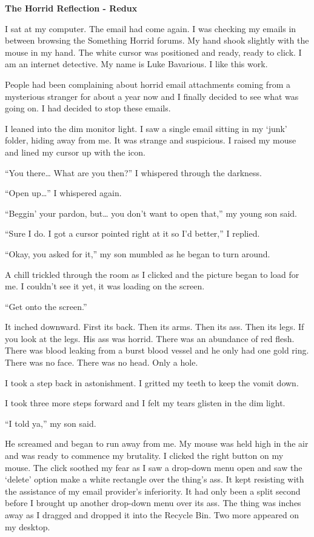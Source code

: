 

{\bf The Horrid Reflection - Redux}



I sat at my computer. The email had come again. I was checking my
emails in between browsing the Something Horrid forums. My hand
shook slightly with the mouse in my hand. The white cursor was
positioned and ready, ready to click. I am an internet detective.
My name is Luke Bavarious. I like this work.

People had been complaining about horrid email attachments coming
from a mysterious stranger for about a year now and I finally
decided to see what was going on. I had decided to stop these
emails.

I leaned into the dim monitor light. I saw a single email sitting
in my `junk' folder, hiding away from me. It was
strange and suspicious. I raised my mouse and lined my cursor up
with the icon.

``You there{\ldots} What are you then?'' I whispered through the
darkness.

``Open up{\ldots}'' I whispered again.

``Beggin' your pardon, but{\ldots} you don't want to open that,'' my young
son said.

``Sure I do. I got a cursor pointed right at it so I'd
better,'' I replied.

``Okay, you asked for it,'' my son mumbled as he began to turn
around.

A chill trickled through the room as I clicked and the picture
began to load for me. I couldn't see it yet, it was loading on the
screen.

``Get onto the screen.''

It inched downward. First its back. Then its arms. Then its ass.
Then its legs. If you look at the legs. His ass was horrid. There
was an abundance of red flesh. There was blood leaking from a burst
blood vessel and he only had one gold ring. There was no face.
There was no head. Only a hole.

I took a step back in astonishment. I gritted my teeth to keep the
vomit down.

I took three more steps forward and I felt my tears glisten in the
dim light.

``I told ya,'' my son said.

He screamed and began to run away from me. My mouse was held high
in the air and was ready to commence my brutality. I clicked the
right button on my mouse. The click soothed my fear as I saw a
drop-down menu open and saw the `delete' option make a
white rectangle over the thing's ass. It kept resisting with the
assistance of my email provider's inferiority. It had only
been a split second before I brought up another drop-down menu over
its ass. The thing was inches away as I dragged and dropped it into
the Recycle Bin. Two more appeared on my desktop.

